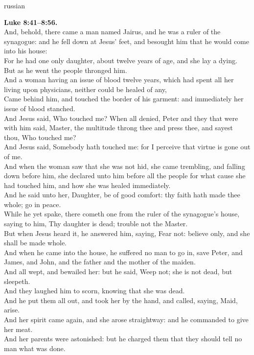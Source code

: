 \documentclass[10pt]{article} %
\begin{document}
{\begin{minipage}[t]{0.45\textwidth}
\begin{otherlanguage*}{russian}
\end{otherlanguage*}
\end{minipage}
\hfill
\begin{minipage}[t]{0.45\textwidth}

\textbf{Luke 8:41--8:56.}\\
And, behold, there came a man named Jairus, and he was a ruler of the synagogue: and he fell down at Jesus' feet, and besought him that he would come into his house:\\
For he had one only daughter, about twelve years of age, and she lay a dying. But as he went the people thronged him.\\
And a woman having an issue of blood twelve years, which had spent all her living upon physicians, neither could be healed of any,\\
Came behind him, and touched the border of his garment: and immediately her issue of blood stanched.\\
And Jesus said, Who touched me? When all denied, Peter and they that were with him said, Master, the multitude throng thee and press thee, and sayest thou, Who touched me?\\
And Jesus said, Somebody hath touched me: for I perceive that virtue is gone out of me.\\
And when the woman saw that she was not hid, she came trembling, and falling down before him, she declared unto him before all the people for what cause she had touched him, and how she was healed immediately.\\
And he said unto her, Daughter, be of good comfort: thy faith hath made thee whole; go in peace.\\
While he yet spake, there cometh one from the ruler of the synagogue's house, saying to him, Thy daughter is dead; trouble not the Master.\\
But when Jesus heard it, he answered him, saying, Fear not: believe only, and she shall be made whole.\\
And when he came into the house, he suffered no man to go in, save Peter, and James, and John, and the father and the mother of the maiden.\\
And all wept, and bewailed her: but he said, Weep not; she is not dead, but sleepeth.\\
And they laughed him to scorn, knowing that she was dead.\\
And he put them all out, and took her by the hand, and called, saying, Maid, arise.\\
And her spirit came again, and she arose straightway: and he commanded to give her meat.\\
And her parents were astonished: but he charged them that they should tell no man what was done.\\

\end{minipage}}
\end{document}
